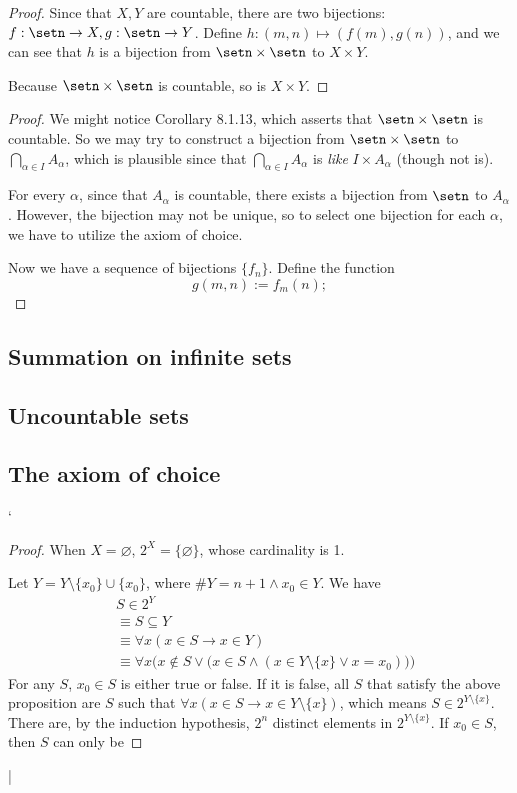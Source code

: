 \begin{proof}
Since that $X,Y$ are countable, there are two bijections: $f: \setn \to X, g: \setn \to Y$. Define $h:(m,n) \mapsto (f(m),g(n))$, and we can see that $h$ is a bijection from $\setn \times \setn$ to $X \times Y$.

Because $\setn \times \setn$ is countable, so is $X \times Y$.
\end{proof}

\begin{proof}
We might notice Corollary 8.1.13, which asserts that $\setn \times \setn$ is countable. So we may try to construct a bijection from $\setn \times \setn$ to $\bigcap_{\alpha \in I} A_\alpha$, which is plausible since that $\bigcap_{\alpha \in I}A_\alpha$ is \emph{like} $I \times A_{\alpha}$ (though not is).

For every $\alpha$, since that $A_\alpha$ is countable, there exists a bijection from $\setn$ to $A_\alpha$. However, the bijection may not be unique, so to select one bijection for each $\alpha$, we have to utilize the axiom of choice.

Now we have a sequence of bijections $\{f_n\}$. Define the function 
\[
g(m,n):=f_m(n);
\]
\end{proof}

\subsection{Summation on infinite sets}

\subsection{Uncountable sets}

\subsection{The axiom of choice}
`
\begin{proof}
When $X = \varnothing$, $2^X = \{\varnothing\}$, whose cardinality is 1.
	
Let $Y = Y\setminus\{x_0\}\cup\{x_0\}$, where $\# Y = n+1 \wedge x_0 \in Y$. We have
\begin{align*}
&S \in 2^Y \\
&\equiv S \subseteq Y\\
&\equiv \forall x(x \in S \to x \in Y)\\
&\equiv \forall x\Big(x \notin S \vee \big(x \in S \wedge (x \in Y\setminus\{x\} \vee x = x_0)\big)\Big)
\end{align*}
For any $S$, $x_0 \in S$ is either true or false. If it is false, all $S$ that satisfy the above proposition are $S$ such that $\forall x (x \in S \to x \in Y\setminus\{x\})$, which means $S \in 2^{Y\setminus\{x\}}$. There are, by the induction hypothesis, $2^n$ distinct elements in $2^{Y\setminus\{x\}}$. If $x_0 \in S$, then $S$ can only be  
\end{proof}|


